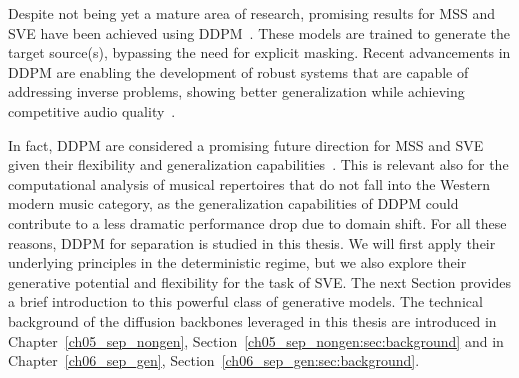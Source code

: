 Despite not being yet a mature area of research, promising results for \acrshort{MSS} and \acrshort{SVE} have been achieved using \acrfull{DDPM}~\citep{mariani-msdm,karchkhadze-msdm_ldm}. These models are trained to generate the target source(s), bypassing the need for explicit masking. %
Recent advancements in \acrshort{DDPM} are enabling the development of robust systems that are capable of addressing inverse problems, showing better generalization while achieving competitive audio quality~\citep{serra-universe}. 


In fact, \acrshort{DDPM} are considered a promising future direction for \acrshort{MSS} and \acrshort{SVE} given their flexibility and generalization capabilities~\citep{araki-30years}. This is relevant also for the computational analysis of musical repertoires that do not fall into the Western modern music category, as the generalization capabilities of \acrshort{DDPM} could contribute to a less dramatic performance drop due to domain shift.
%
For all these reasons, \acrshort{DDPM} for separation is studied in this thesis. We will first apply their underlying principles in the deterministic regime, but we also explore their generative potential and flexibility for the task of \acrshort{SVE}. The next Section provides a brief introduction to this powerful class of generative models. The technical background of the diffusion backbones leveraged in this thesis are introduced in Chapter~\ref{ch05_sep_nongen}, Section~\ref{ch05_sep_nongen:sec:background} and in Chapter~\ref{ch06_sep_gen}, Section~\ref{ch06_sep_gen:sec:background}.
